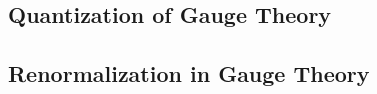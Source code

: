 \documentclass[a4paper,12pt]{article}
\begin{document}
\subsection{Quantization of Gauge Theory}
\subsection{Renormalization in Gauge Theory}
\end{document}
